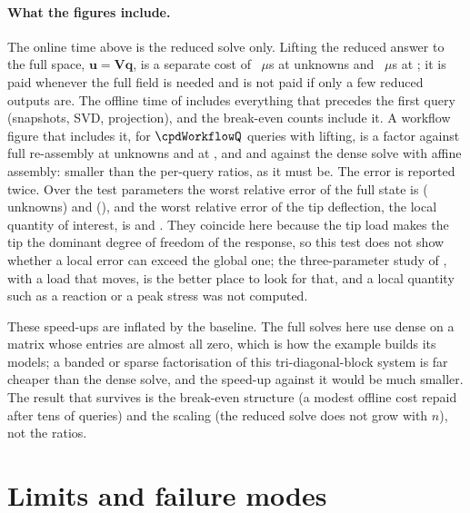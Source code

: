 \paragraph{What the figures include.} The online time above is the reduced solve only. Lifting the reduced answer to the full space, $\bm u=\bm V\bm q$, is a separate cost of \cpdRecUs~$\mu$s at \cpdNFree{} unknowns and \cpdRecUsBig~$\mu$s at \cpdBigNf; it is paid whenever the full field is needed and is not paid if only a few reduced outputs are. The offline time of  includes everything that precedes the first query (snapshots, SVD, projection), and the break-even counts include it. A workflow figure that includes it, for $\cpdWorkflowQ$ queries with lifting, is a factor \cpdWorkflow{} against full re-assembly at \cpdNFree{} unknowns and \cpdWorkflowBig{} at \cpdBigNf, and \cpdWorkflowSparseFree{} and \cpdWorkflowSparseFreeBig{} against the dense solve with affine assembly: smaller than the per-query ratios, as it must be. The error is reported twice. Over the test parameters the worst relative error of the full state is \cpdGlobErr{} (\cpdNFree{} unknowns) and \cpdGlobErrBig{} (\cpdBigNf), and the worst relative error of the tip deflection, the local quantity of interest, is \cpdLocErr{} and \cpdLocErrBig. They coincide here because the tip load makes the tip the dominant degree of freedom of the response, so this test does not show whether a local error can exceed the global one; the three-parameter study of , with a load that moves, is the better place to look for that, and a local quantity such as a reaction or a peak stress was not computed.


These speed-ups are inflated by the baseline. The full solves here use dense  on a matrix whose entries are almost all zero, which is how the example builds its models; a banded or sparse factorisation of this tri-diagonal-block system is far cheaper than the dense solve, and the speed-up against it would be much smaller. The result that survives is the break-even structure (a modest offline cost repaid after tens of queries) and the scaling (the reduced solve does not grow with $n$), not the ratios.

\section{Limits and failure modes}\label{sec:pod-limits}

